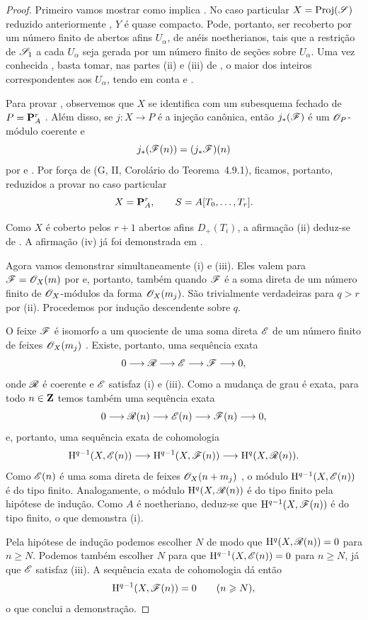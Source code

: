 \begin{proof}
Primeiro vamos mostrar como  implica .
No caso particular $X=\operatorname{Proj}(\mathscr{S})$ reduzido anteriormente , $Y$ é quase compacto.
Pode, portanto, ser recoberto por um número finito de abertos afins $U_\alpha$, de anéis noetherianos, tais que a restrição de $\mathscr{S}_1$ a cada $U_\alpha$ seja gerada por um número finito de seções sobre $U_\alpha$.
Uma vez conhecida , basta tomar, nas partes (ii) e (iii) de , o maior dos inteiros correspondentes aos $U_\alpha$, tendo em conta  e .

Para provar , observemos que $X$ se identifica com um subesquema fechado de $P=\mathbf{P}_A^r$ .
Além disso, se $j:X\to P$ é a injeção canônica, então $j_*(\mathscr{F})$ é um $\mathscr{O}_P$-módulo coerente e
\[
  j_*(\mathscr{F}(n))=(j_*\mathscr{F})(n)
\]
por  e .
Por força de (G, II, Corolário do Teorema~4.9.1), ficamos, portanto, reduzidos a provar  no caso particular
\[
  X=\mathbf{P}_A^r,
  \qquad S=A[T_0,\ldots,T_r].
\]


Como $X$ é coberto pelos $r+1$ abertos afins $D_+(T_i)$, a afirmação (ii) deduz-se de .
A afirmação (iv) já foi demonstrada em .

Agora vamos demonstrar simultaneamente (i) e (iii).
Eles valem para $\mathscr{F}=\mathscr{O}_X(m)$ por  e, portanto, também quando $\mathscr{F}$ é a soma direta de um número finito de $\mathscr{O}_X$-módulos da forma $\mathscr{O}_X(m_j)$.
São trivialmente verdadeiras para $q>r$ por (ii).
Procedemos por indução descendente sobre $q$.

O feixe $\mathscr{F}$ é isomorfo a um quociente de uma soma direta $\mathscr{E}$ de um número finito de feixes $\mathscr{O}_X(m_j)$ .
Existe, portanto, uma sequência exata
\[
  0\longrightarrow\mathscr{R}\longrightarrow\mathscr{E}
   \longrightarrow\mathscr{F}\longrightarrow0,
\]
onde $\mathscr{R}$ é coerente  e $\mathscr{E}$ satisfaz (i) e (iii).
Como a mudança de grau é exata, para todo $n\in\mathbf{Z}$ temos também uma sequência exata
\[
  0\longrightarrow\mathscr{R}(n)\longrightarrow\mathscr{E}(n)
   \longrightarrow\mathscr{F}(n)\longrightarrow0,
\]
e, portanto, uma sequência exata de cohomologia
\[
  \mathrm{H}^{q-1}(X,\mathscr{E}(n))
  \longrightarrow\mathrm{H}^{q-1}(X,\mathscr{F}(n))
  \longrightarrow\mathrm{H}^q(X,\mathscr{R}(n)).
\]
Como $\mathscr{E}(n)$ é uma soma direta de feixes $\mathscr{O}_X(n+m_j)$ , o módulo $\mathrm{H}^{q-1}(X,\mathscr{E}(n))$ é do tipo finito.
Analogamente, o módulo $\mathrm{H}^q(X,\mathscr{R}(n))$ é do tipo finito pela hipótese de indução.
Como $A$ é noetheriano, deduz-se que $\mathrm{H}^{q-1}(X,\mathscr{F}(n))$ é do tipo finito, o que demonstra (i).

Pela hipótese de indução podemos escolher $N$ de modo que $\mathrm{H}^q(X,\mathscr{R}(n))=0$ para $n\geq N$.
Podemos também escolher $N$ para que $\mathrm{H}^{q-1}(X,\mathscr{E}(n))=0$ para $n\geq N$, já que $\mathscr{E}$ satisfaz (iii).
A sequência exata de cohomologia dá então
\[
  \mathrm{H}^{q-1}(X,\mathscr{F}(n))=0
  \qquad(n\geqslant N),
\]
o que conclui a demonstração.
\end{proof}

